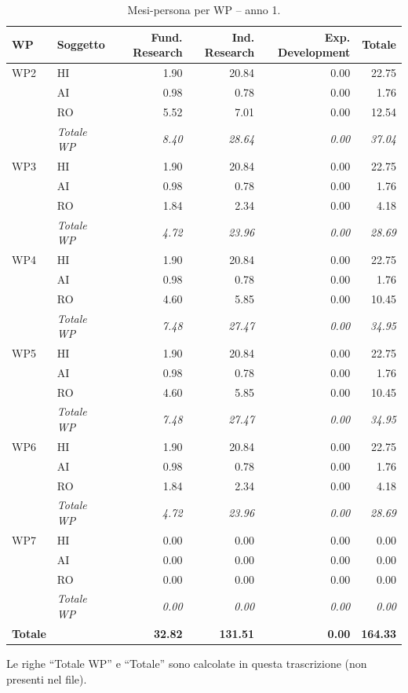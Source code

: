 \documentclass{plan4ari_report}
\begin{document}
\begin{table}[H]\centering\small\caption{Mesi-persona per WP -- anno 1.}\label{tab:wp-w-y1}
\begin{tabular}{llrrrr}\toprule\textbf{WP} & \textbf{Soggetto} & \textbf{Fund. Research} & \textbf{Ind. Research} & \textbf{Exp. Development} & \textbf{Totale} \\\midrule
WP2 & HI & 1.90 & 20.84 & 0.00 & 22.75 \\
 & AI & 0.98 & 0.78 & 0.00 & 1.76 \\
 & RO & 5.52 & 7.01 & 0.00 & 12.54 \\
 & \textit{Totale WP} & \textit{8.40} & \textit{28.64} & \textit{0.00} & \textit{37.04} \\\midrule
WP3 & HI & 1.90 & 20.84 & 0.00 & 22.75 \\
 & AI & 0.98 & 0.78 & 0.00 & 1.76 \\
 & RO & 1.84 & 2.34 & 0.00 & 4.18 \\
 & \textit{Totale WP} & \textit{4.72} & \textit{23.96} & \textit{0.00} & \textit{28.69} \\\midrule
WP4 & HI & 1.90 & 20.84 & 0.00 & 22.75 \\
 & AI & 0.98 & 0.78 & 0.00 & 1.76 \\
 & RO & 4.60 & 5.85 & 0.00 & 10.45 \\
 & \textit{Totale WP} & \textit{7.48} & \textit{27.47} & \textit{0.00} & \textit{34.95} \\\midrule
WP5 & HI & 1.90 & 20.84 & 0.00 & 22.75 \\
 & AI & 0.98 & 0.78 & 0.00 & 1.76 \\
 & RO & 4.60 & 5.85 & 0.00 & 10.45 \\
 & \textit{Totale WP} & \textit{7.48} & \textit{27.47} & \textit{0.00} & \textit{34.95} \\\midrule
WP6 & HI & 1.90 & 20.84 & 0.00 & 22.75 \\
 & AI & 0.98 & 0.78 & 0.00 & 1.76 \\
 & RO & 1.84 & 2.34 & 0.00 & 4.18 \\
 & \textit{Totale WP} & \textit{4.72} & \textit{23.96} & \textit{0.00} & \textit{28.69} \\\midrule
WP7 & HI & 0.00 & 0.00 & 0.00 & 0.00 \\
 & AI & 0.00 & 0.00 & 0.00 & 0.00 \\
 & RO & 0.00 & 0.00 & 0.00 & 0.00 \\
 & \textit{Totale WP} & \textit{0.00} & \textit{0.00} & \textit{0.00} & \textit{0.00} \\
\midrule\textbf{Totale} & & \textbf{32.82} & \textbf{131.51} & \textbf{0.00} & \textbf{164.33} \\
\bottomrule\end{tabular}
\par\smallskip\footnotesize Le righe ``Totale WP'' e ``Totale'' sono calcolate in questa trascrizione (non presenti nel file).
\end{table}
\end{document}
